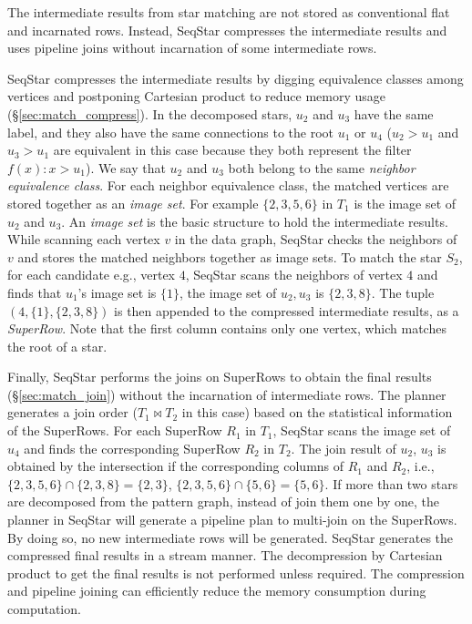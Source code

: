The intermediate results from star matching are not stored as conventional flat and incarnated rows. Instead, SeqStar compresses the intermediate results and uses pipeline joins without incarnation of some intermediate rows.

SeqStar compresses the intermediate results by digging equivalence classes among vertices and postponing Cartesian product to reduce memory usage (\S\ref{sec:match_compress}).
In the decomposed stars, $u_2$ and $u_3$ have the same label, and they also have the same connections to the root $u_1$ or $u_4$ ($u_2 > u_1$ and $u_3 > u_1$ are equivalent in this case because they both represent the filter $f(x): x > u_1$).
We say that $u_2$ and $u_3$ both belong to the same \emph{neighbor equivalence class}.
For each neighbor equivalence class, the matched vertices are stored together as an \emph{image set}.
For example $\{2, 3, 5, 6\}$ in $T_1$ is the image set of $u_2$ and $u_3$.
An \emph{image set} is the basic structure to hold the intermediate results.
While scanning each vertex $v$ in the data graph,
SeqStar checks the neighbors of $v$ and stores the matched neighbors together as image sets.
To match the star $S_2$,
for each candidate e.g., vertex $4$, SeqStar scans the neighbors of vertex $4$ and finds that $u_1$'s image set is $\{1\}$,
the image set of $u_2, u_3$ is $\{2, 3, 8\}$.
The tuple $(4, \{1\}, \{2, 3, 8\})$ is then appended to the compressed intermediate results, as a \emph{SuperRow}.
Note that the first column contains only one vertex, which matches the root of a star.

Finally, SeqStar performs the joins on SuperRows to obtain the final results (\S\ref{sec:match_join}) without the incarnation of intermediate rows. The planner generates a join order ($T_1 \Join T_2$ in this case) based on the statistical information of the SuperRows.
For each SuperRow $R_1$ in $T_1$, SeqStar scans the image set of $u_4$ and finds the corresponding SuperRow $R_2$ in $T_2$.
The join result of $u_2$, $u_3$ is obtained by the intersection if the corresponding columns of $R_1$ and $R_2$,
i.e., $\{2, 3, 5, 6\} \cap \{2, 3, 8\} = \{2, 3\}$, $\{2, 3, 5, 6\} \cap \{5, 6\} = \{5, 6\}$.
If more than two stars are decomposed from the pattern graph,
instead of join them one by one,
the planner in SeqStar will generate a pipeline plan to multi-join on the SuperRows.
By doing so, no new intermediate rows will be generated.
SeqStar generates the compressed final results in a stream manner.
The decompression by Cartesian product to get the final results is not performed     unless required. The compression and pipeline joining can efficiently reduce the memory consumption during computation.

